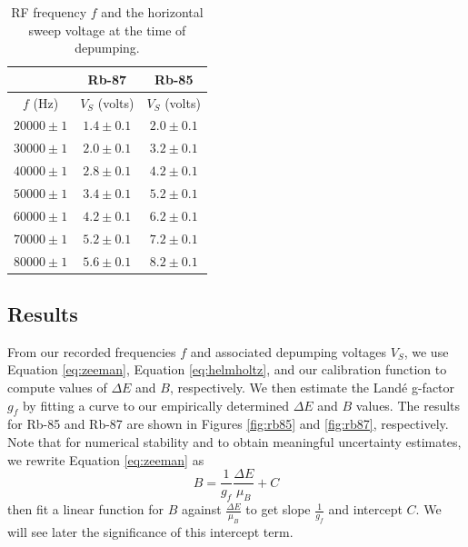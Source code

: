 \documentclass[12pt, letterpaper]{article}
\begin{document}
\begin{table}[!h]
    \centering
    \begin{tabular}{| c | c | c |}
        \hline
        & Rb-87  & Rb-85 \\
        \hline
        $f$ (Hz) &  $V_S$ (volts) & $V_S$ (volts) \\
        \hline
        $20000 \pm 1$ & $1.4 \pm 0.1$ & $2.0 \pm 0.1$ \\
        $30000 \pm 1$ & $2.0 \pm 0.1$ & $3.2 \pm 0.1$ \\
        $40000 \pm 1$ & $2.8 \pm 0.1$ & $4.2 \pm 0.1$ \\
        $50000 \pm 1$ & $3.4 \pm 0.1$ & $5.2 \pm 0.1$ \\
        $60000 \pm 1$ & $4.2 \pm 0.1$ & $6.2 \pm 0.1$ \\
        $70000 \pm 1$ & $5.2 \pm 0.1$ & $7.2 \pm 0.1$ \\
        $80000 \pm 1$ & $5.6 \pm 0.1$ & $8.2 \pm 0.1$ \\
        \hline
    \end{tabular}
    \caption{RF frequency $f$ and the horizontal sweep voltage at the time of depumping. }
    \label{tab:weak}
\end{table}

\subsection{Results}

From our recorded frequencies $f$ and associated depumping voltages $V_S$, we use Equation \ref{eq:zeeman}, Equation \ref{eq:helmholtz}, and our calibration function to compute values of $\Delta E$ and $B$, respectively. We then estimate the Landé g-factor $g_f$ by fitting a curve to our empirically determined $\Delta E$ and $B$ values. The results for Rb-85 and Rb-87 are shown in Figures \ref{fig:rb85} and \ref{fig:rb87}, respectively. Note that for numerical stability and to obtain meaningful uncertainty estimates, we rewrite Equation \ref{eq:zeeman} as 
\[
B = \frac{1}{g_f} \frac{\Delta E}{\mu_B} + C
\]
then fit a linear function for $B$ against $\frac{\Delta E}{\mu_B}$ to get slope $\frac{1}{g_f}$ and intercept $C$. We will see later the significance of this intercept term. 
\end{document}
